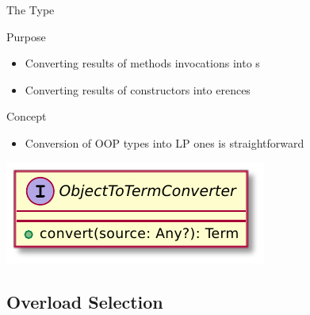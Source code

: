 \documentclass[handout]{beamer}
\begin{document}
\begin{frame}[allowframebreaks]{The  Type}
    \begin{block}{Purpose}
        \begin{itemize}
            \item Converting \alert{results} of methods invocations into \alert{s}
            \item Converting \alert{results} of constructors into \alert{erences}
        \end{itemize}
    \end{block}

    \begin{alertblock}{Concept}
        \begin{itemize}
            \item Conversion of OOP types into LP ones is \alert{straightforward}
        \end{itemize}
    \end{alertblock}

    \framebreak

    \begin{center}
        \includegraphics[width=.5\linewidth]{img/ObjectToTermConverter.pdf}
    \end{center}

    \framebreak

    \begin{center}
        
    \end{center}
\end{frame}

\subsection{Overload Selection}
\end{document}
